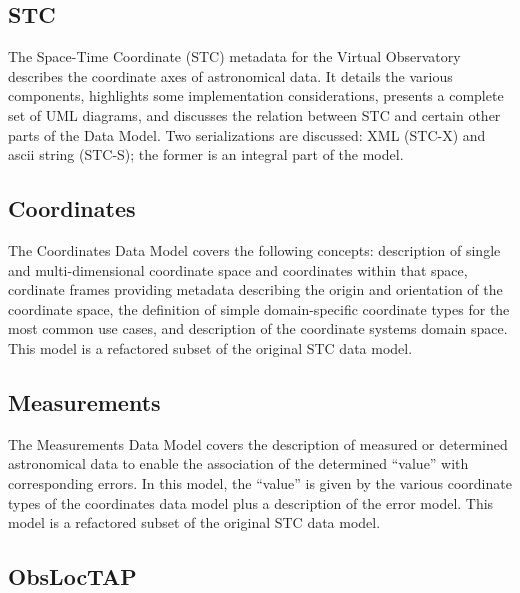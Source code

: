 \documentclass[11pt,letter]{ivoa}
\begin{document}
\subsection{STC}

The Space-Time Coordinate (STC) \citep{2007ivoa.spec.1030R} metadata for the Virtual Observatory describes the coordinate 
axes of astronomical data. It details the various components, highlights some implementation 
considerations, presents a complete set of UML diagrams, and discusses the relation between 
STC and certain other parts of the Data Model. Two serializations are discussed: XML (STC-X) and
ascii string (STC-S); the former is an integral part of the model.

\subsection{Coordinates}

The Coordinates Data Model \citep{2022ivoa.specQ1004R} 
covers the following concepts: description of single and multi-dimensional 
coordinate space and coordinates within that space, cordinate frames providing metadata describing the 
origin and orientation of the coordinate space, the definition of simple domain-specific coordinate
types for the most common use cases, and description of the coordinate systems domain space. This
model is a refactored subset of the original STC data model.

\subsection{Measurements}

The Measurements Data Model \citep{2022ivoa.spec.1004R} 
covers the description of measured or determined astronomical data 
to enable the association of the determined ``value'' with corresponding errors. In this model, 
the ``value'' is given by the various coordinate types of the coordinates data model plus a 
description of the error model.  This model is a refactored subset of the original STC data model.

\subsection{ObsLocTAP} 
\end{document}
